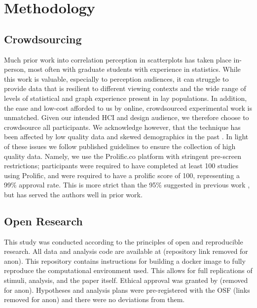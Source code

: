 \documentclass[manuscript, anonymous, screen]{acmart}
\begin{document}
\hypertarget{sec-methods}{%
\section{Methodology}\label{sec-methods}}

\hypertarget{sec-crowdsourcing}{%
\subsection{Crowdsourcing}\label{sec-crowdsourcing}}

Much prior work into correlation perception in scatterplots has taken
place in-person, most often with graduate students with experience in
statistics. While this work is valuable, especially to perception
audiences, it can struggle to provide data that is resilient to
different viewing contexts and the wide range of levels of statistical
and graph experience present in lay populations. In addition, the ease
and low-cost afforded to us by online, crowdsourced experimental work is
unmatched. Given our intended HCI and design audience, we therefore
choose to crowdsource all participants. We acknowledge however, that the
technique has been affected by low quality data and skewed demographics
in the past \citep{chmielewski_2020, charalambides_2021, peer_2021}. In
light of these issues we follow published guidelines \citep{peer_2021}
to ensure the collection of high quality data. Namely, we use the
Prolific.co platform \citep{prolific} with stringent pre-screen
restrictions; participants were required to have completed at least 100
studies using Prolific, and were required to have a prolific score of
100, representing a 99\% approval rate. This is more strict than the
95\% suggested in previous work \citep{peer_2021}, but has served the
authors well in prior work.

\hypertarget{sec-open-research}{%
\subsection{Open Research}\label{sec-open-research}}

This study was conducted according to the principles of open and
reproducible research. All data and analysis code are available at
(repository link removed for anon). This repository contains
instructions for building a docker image to fully reproduce the
computational environment used. This allows for full replications of
stimuli, analysis, and the paper itself. Ethical approval was granted by
(removed for anon). Hypotheses and analysis plans were pre-registered
with the OSF (links removed for anon) and there were no deviations from
them.
\end{document}

